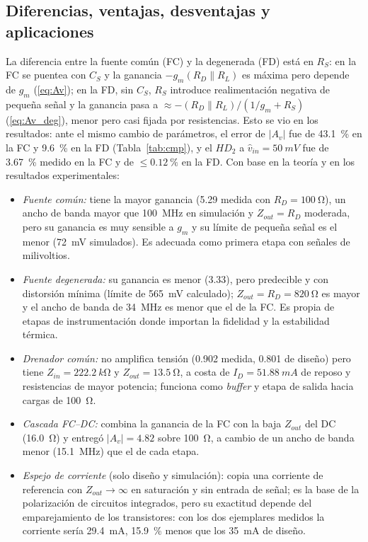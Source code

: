 \documentclass[conference]{IEEEtran}
\newcommand{\gm}{g_m}
\begin{document}
\subsection{Diferencias, ventajas, desventajas y aplicaciones}
\label{sec:an_comp}
La diferencia entre la fuente común (FC) y la degenerada (FD) está en $R_S$: en la FC se puentea con $C_S$ y la ganancia $-\gm(R_D\parallel R_L)$ es máxima pero depende de $\gm$ (\eqref{eq:Av}); en la FD, sin $C_S$, $R_S$ introduce realimentación negativa de pequeña señal y la ganancia pasa a $\approx-(R_D\parallel R_L)/(1/\gm+R_S)$ (\eqref{eq:Av_deg}), menor pero casi fijada por resistencias. Esto se vio en los resultados: ante el mismo cambio de parámetros, el error de $|A_v|$ fue de \SI{43.1}{\percent} en la FC y \SI{9.6}{\percent} en la FD (Tabla~\ref{tab:cmp}), y el $HD_2$ a $\hat v_{in}=\SI{50}{mV}$ fue de \SI{3.67}{\percent} medido en la FC y de $\le\SI{0.12}{\percent}$ en la FD. Con base en la teoría y en los resultados experimentales:
\begin{itemize}
    \item \emph{Fuente común:} tiene la mayor ganancia (5.29 medida con $R_D=\SI{100}{\ohm}$), un ancho de banda mayor que \SI{100}{MHz} en simulación y $Z_{out}=R_D$ moderada, pero su ganancia es muy sensible a $\gm$ y su límite de pequeña señal es el menor (\SI{72}{mV} simulados). Es adecuada como primera etapa con señales de milivoltios.
    \item \emph{Fuente degenerada:} su ganancia es menor (3.33), pero predecible y con distorsión mínima (límite de \SI{565}{mV} calculado); $Z_{out}=R_D=\SI{820}{\ohm}$ es mayor y el ancho de banda de \SI{34}{MHz} es menor que el de la FC. Es propia de etapas de instrumentación donde importan la fidelidad y la estabilidad térmica.
    \item \emph{Drenador común:} no amplifica tensión (0.902 medida, 0.801 de diseño) pero tiene $Z_{in}=\SI{222.2}{k\ohm}$ y $Z_{out}=\SI{13.5}{\ohm}$, a costa de $I_D=\SI{51.88}{mA}$ de reposo y resistencias de mayor potencia; funciona como \emph{buffer} y etapa de salida hacia cargas de \SI{100}{\ohm}.
    \item \emph{Cascada FC--DC:} combina la ganancia de la FC con la baja $Z_{out}$ del DC (\SI{16.0}{\ohm}) y entregó $|A_v|=4.82$ sobre \SI{100}{\ohm}, a cambio de un ancho de banda menor (\SI{15.1}{MHz}) que el de cada etapa.
    \item \emph{Espejo de corriente} (solo diseño y simulación): copia una corriente de referencia con $Z_{out}\to\infty$ en saturación y sin entrada de señal; es la base de la polarización de circuitos integrados, pero su exactitud depende del emparejamiento de los transistores: con los dos ejemplares medidos la corriente sería \SI{29.4}{mA}, \SI{15.9}{\percent} menos que los \SI{35}{mA} de diseño.
\end{itemize}
\end{document}
